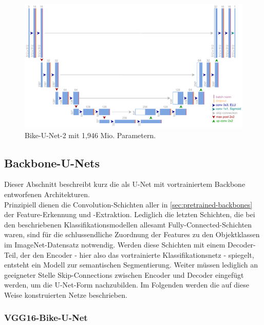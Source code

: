 \begin{figure}
	\centering
	\includegraphics[width=1.\textwidth]{Bilder/own-unet-2mil.pdf} 
	\caption{Bike-U-Net-2 mit 1,946 Mio. Parametern.}
	\label{fig:bike-unet-2}
\end{figure} 


\subsection{Backbone-U-Nets}

Dieser Abschnitt beschreibt kurz die als U-Net mit vortrainiertem Backbone entworfenen Architekturen. \\
Prinzipiell dienen die Convolution-Schichten aller in \autoref{sec:pretrained-backbones} der Feature-Erkennung 
und -Extraktion. Lediglich die letzten Schichten, die bei den beschriebenen Klassifikationsmodellen allesamt 
Fully-Connected-Schichten waren, sind für die schlussendliche Zuordnung der Features zu den Objektklassen 
im ImageNet-Datensatz notwendig. Werden diese Schichten mit einem Decoder-Teil, der den Encoder - hier 
also das vortrainierte Klassifikationsnetz - spiegelt, entsteht ein Modell zur semantischen Segmentierung. 
Weiter müssen lediglich an geeigneter Stelle Skip-Connections zwischen Encoder und Decoder eingefügt werden,
um die U-Net-Form nachzubilden. Im Folgenden werden die auf diese Weise konstruierten Netze beschrieben. 

\subsubsection{VGG16-Bike-U-Net}

